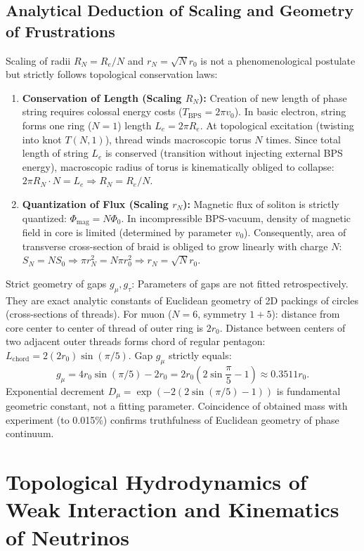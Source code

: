 \documentclass[12pt,a4paper]{article}
\begin{document}
\subsection{Analytical Deduction of Scaling and Geometry of Frustrations}
Scaling of radii $R_N = R_e/N$ and $r_N = \sqrt{N}r_0$ is not a phenomenological postulate but strictly follows topological conservation laws:
\begin{enumerate}
    \item \textbf{Conservation of Length (Scaling $R_N$):} Creation of new length of phase string requires colossal energy costs ($T_{\text{BPS}} = 2\pi v_0$). In basic electron, string forms one ring ($N=1$) length $L_e = 2\pi R_e$. At topological excitation (twisting into knot $T(N,1)$), thread winds macroscopic torus $N$ times. Since total length of string $L_e$ is conserved (transition without injecting external BPS energy), macroscopic radius of torus is kinematically obliged to collapse: $2\pi R_N \cdot N = L_e \Rightarrow R_N = R_e/N$.
    \item \textbf{Quantization of Flux (Scaling $r_N$):} Magnetic flux of soliton is strictly quantized: $\Phi_{\text{mag}} = N\Phi_0$. In incompressible BPS-vacuum, density of magnetic field in core is limited (determined by parameter $v_0$). Consequently, area of transverse cross-section of braid is obliged to grow linearly with charge $N$: $S_N = N S_0 \Rightarrow \pi r_N^2 = N\pi r_0^2 \Rightarrow r_N = \sqrt{N}r_0$.
\end{enumerate}
Strict geometry of gaps $g_\mu, g_\tau$: Parameters of gaps are not fitted retrospectively. They are exact analytic constants of Euclidean geometry of 2D packings of circles (cross-sections of threads). For muon ($N=6$, symmetry $1+5$): distance from core center to center of thread of outer ring is $2r_0$. Distance between centers of two adjacent outer threads forms chord of regular pentagon: $L_{\text{chord}} = 2(2r_0)\sin(\pi/5)$. Gap $g_\mu$ strictly equals:
\begin{equation}
    g_\mu = 4r_0 \sin(\pi/5) - 2r_0 = 2r_0 \left( 2\sin\frac{\pi}{5}-1 \right) \approx 0.3511 r_0.
    \label{eq:gap_muon}
\end{equation}
Exponential decrement $D_\mu = \exp(-2(2\sin(\pi/5)-1))$ is fundamental geometric constant, not a fitting parameter. Coincidence of obtained mass with experiment (to 0.015\%) confirms truthfulness of Euclidean geometry of phase continuum.

\section{Topological Hydrodynamics of Weak Interaction and Kinematics of Neutrinos}
\end{document}
